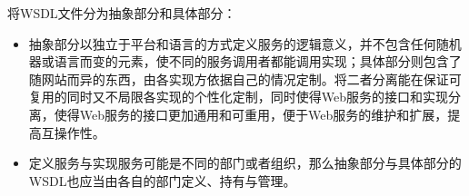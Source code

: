 \begin{solution}
将WSDL文件分为抽象部分和具体部分：
\begin{itemize}
    \item 抽象部分以独立于平台和语言的方式定义服务的逻辑意义，并不包含任何随机器或语言而变的元素，使不同的服务调用者都能调用实现；具体部分则包含了随网站而异的东西，由各实现方依据自己的情况定制。将二者分离能在保证可复用的同时又不局限各实现的个性化定制，同时使得Web服务的接口和实现分离，使得Web服务的接口更加通用和可重用，便于Web服务的维护和扩展，提高互操作性。
    \item 定义服务与实现服务可能是不同的部门或者组织，那么抽象部分与具体部分的WSDL也应当由各自的部门定义、持有与管理。
\end{itemize}

\end{solution}